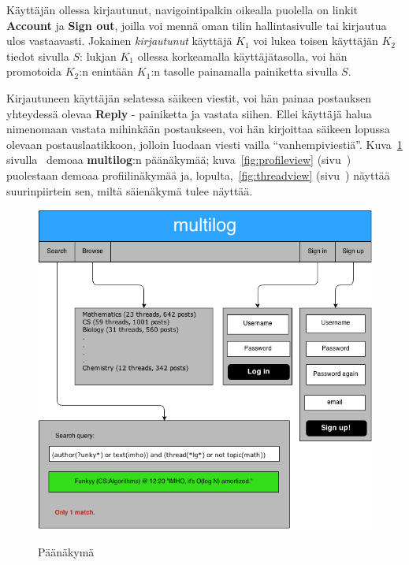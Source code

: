 \documentclass[10pt]{article}
\begin{document}
Käyttäjän ollessa kirjautunut, navigointipalkin oikealla puolella on linkit \- \textbf{Account} ja \textbf{Sign out}, joilla voi mennä oman tilin hallintasivulle tai kirjautua ulos vastaavasti. Jokainen \textit{kirjautunut} käyttäjä $K_1$ voi lukea toisen käyttäjän $K_2$ tiedot sivulla $S$: lukjan $K_1$ ollessa korkeamalla käyttäjätasolla, voi hän promotoida $K_2$:n enintään $K_1$:n tasolle painamalla painiketta sivulla $S$.

Kirjautuneen käyttäjän selatessa säikeen viestit, voi hän painaa postauksen yhteydessä olevaa \textbf{Reply} - painiketta ja vastata siihen. Ellei käyttäjä halua nimenomaan vastata mihinkään postaukseen, voi hän kirjoittaa säikeen lopussa olevaan postauslaatikkoon, jolloin luodaan viesti vailla ``vanhempiviestiä''. Kuva~\ref{fig:mainview} sivulla~\pageref{fig:mainview} demoaa \textbf{multilog}:n päänäkymää; kuva~\ref{fig:profileview} (sivu~\pageref{fig:profileview}) puolestaan demoaa profiilinäkymää ja, lopulta,~\ref{fig:threadview} (sivu~\pageref{fig:threadview}) näyttää suurinpiirtein sen, miltä säienäkymä tulee näyttää.
\begin{figure}
  \caption{Päänäkymä}
  \centering
  \includegraphics[width=\textwidth, keepaspectratio]{UIMainPage}
  \label{fig:mainview}
\end{figure}
\end{document}
